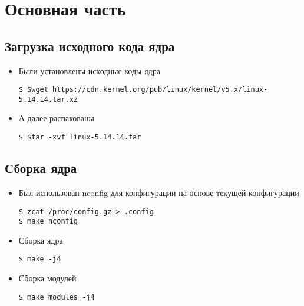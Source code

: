 \documentclass[a4paper]{article}
\begin{document}
    \section{Основная часть}

    \subsection{Загрузка исходного кода ядра}
    \begin{itemize}
        \item Были установлены исходные коды ядра
        \begin{verbatim}
$ $wget https://cdn.kernel.org/pub/linux/kernel/v5.x/linux-5.14.14.tar.xz
        \end{verbatim}
        \item А далее распакованы
        \begin{verbatim}
$ $tar -xvf linux-5.14.14.tar
        \end{verbatim}
    \end{itemize}

    \subsection{Сборка ядра}
    \begin{itemize}
        \item Был использован nconfig для конфигурации на основе текущей конфигурации
        \begin{verbatim}
$ zcat /proc/config.gz > .config
$ make nconfig
        \end{verbatim}
        \item Сборка ядра
        \begin{verbatim}
$ make -j4
        \end{verbatim}
        \item Сборка модулей
        \begin{verbatim}
$ make modules -j4
        \end{verbatim}
    \end{itemize}
\end{document}
